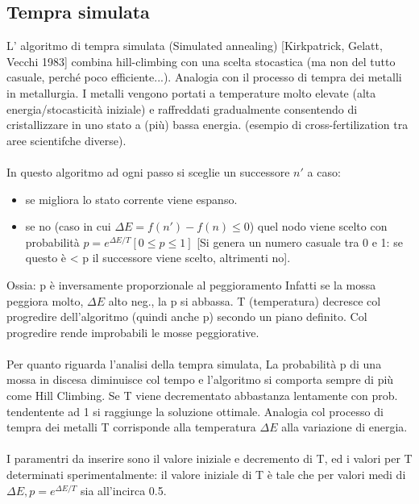\subsection{Tempra simulata}
L’ algoritmo di tempra simulata (Simulated annealing) [Kirkpatrick, Gelatt, Vecchi 1983] combina hill-climbing con una scelta stocastica (ma non del tutto casuale, perché poco efficiente...).
Analogia con il processo di tempra dei metalli in metallurgia. I metalli vengono portati a temperature molto elevate (alta
energia/stocasticità iniziale) e raffreddati gradualmente consentendo di cristallizzare in uno stato a (più) bassa energia.
(esempio di cross-fertilization tra aree scientifche diverse).\\\\
In questo algoritmo ad ogni passo si sceglie un successore $n'$ a caso:
\begin{itemize}
    \item se migliora lo stato corrente viene espanso.
    \item se no (caso in cui $\Delta E = f(n') - f(n) \leq 0$) quel nodo viene scelto con probabilità $p = e^{\Delta E/T} [0 \leq p \leq 1]$ [Si genera un numero casuale tra 0 e 1: se questo è < p il successore
    viene scelto, altrimenti no].
\end{itemize}
Ossia: p è inversamente proporzionale al peggioramento Infatti se la mossa peggiora molto, $\Delta E$ alto neg., la p si abbassa. 
T (temperatura) decresce col progredire dell’algoritmo (quindi anche p) secondo un piano definito. Col progredire rende improbabili le mosse peggiorative.\\\\
Per quanto riguarda l'analisi della tempra simulata, La probabilità p di una mossa in discesa diminuisce col tempo e l’algoritmo si comporta sempre di più come Hill Climbing.
Se T viene decrementato abbastanza lentamente con prob. tendentente ad 1 si raggiunge la soluzione ottimale. Analogia col processo di tempra dei metalli
T corrisponde alla temperatura $\Delta E$ alla variazione di energia.\\\\
I paramentri da inserire sono il valore iniziale e decremento di T, ed i valori 
per T determinati sperimentalmente: il valore iniziale di T è tale che per valori medi di $\Delta E, p=e^{\Delta E/T}$ sia all’incirca 0.5. 

